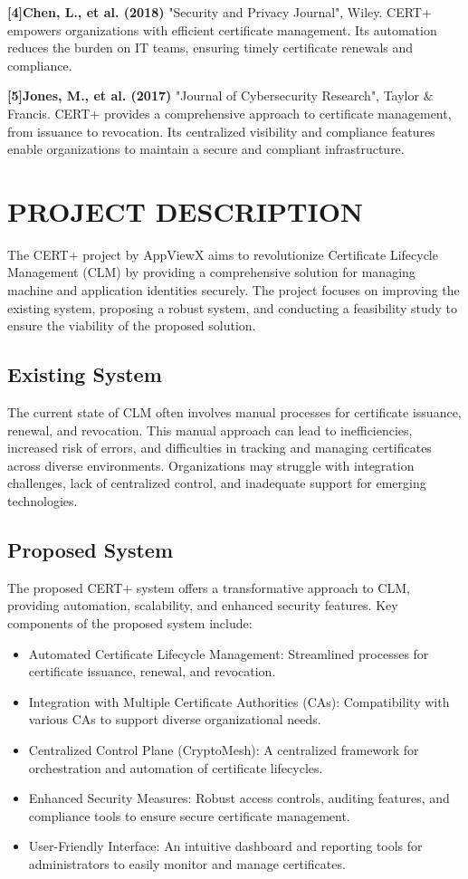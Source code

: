 \documentclass[10pt]{report}
\begin{document}
\textbf{[4]Chen, L., et al. (2018)} "Security and Privacy Journal", Wiley. CERT+ empowers organizations with efficient certificate management. Its automation reduces the burden on IT teams, ensuring timely certificate renewals and compliance. 

\textbf{[5]Jones, M., et al. (2017)} "Journal of Cybersecurity Research", Taylor \& Francis. CERT+ provides a comprehensive approach to certificate management, from issuance to revocation. Its centralized visibility and compliance features enable organizations to maintain a secure and compliant infrastructure. 


\linespread{1.5}
\chapter{PROJECT DESCRIPTION}
The CERT+ project by AppViewX aims to revolutionize Certificate Lifecycle Management (CLM) by providing a comprehensive solution for managing machine and application identities securely. The project focuses on improving the existing system, proposing a robust system, and conducting a feasibility study to ensure the viability of the proposed solution.

\linespread{1.5}
\section{Existing System}
The current state of CLM often involves manual processes for certificate issuance, renewal, and revocation. This manual approach can lead to inefficiencies, increased risk of errors, and difficulties in tracking and managing certificates across diverse environments. Organizations may struggle with integration challenges, lack of centralized control, and inadequate support for emerging technologies.


\section{Proposed System}
The proposed CERT+ system offers a transformative approach to CLM, providing automation, scalability, and enhanced security features. Key components of the proposed system include:
\begin{itemize}
    \item Automated Certificate Lifecycle Management: Streamlined processes for certificate issuance, renewal, and revocation.
    \item Integration with Multiple Certificate Authorities (CAs): Compatibility with various CAs to support diverse organizational needs.
    \item Centralized Control Plane (CryptoMesh): A centralized framework for orchestration and automation of certificate lifecycles.
    \item Enhanced Security Measures: Robust access controls, auditing features, and compliance tools to ensure secure certificate management.
    \item User-Friendly Interface: An intuitive dashboard and reporting tools for administrators to easily monitor and manage certificates.
\end{itemize}
\end{document}
